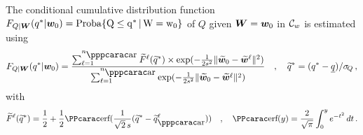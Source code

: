  The conditional cumulative distribution function $F_{Q \vert {\boldsymbol{W}}}(q^*\vert{\boldsymbol{w}}_{0}) 
= \rm{Proba}\{Q\leq q^*\,\vert\,{\boldsymbol{W}} = {\boldsymbol{w}}_0 \}$ of $Q$ given ${\boldsymbol{W}} = {\boldsymbol{w}}_0$ in ${\mathcal{C}}_w$ is estimated using
%
\begin{equation}\label{eqPLoMA8}
    F_{Q\vert\bfW}(q^* \vert \bfw_0 ) 
    = \frac{ \sum_{\ell=1}^{n_\ar} \widetilde{F}^\ell (\widetilde{q}^*) \times 
              \exp( -\frac{1}{2s^2} \Vert \widetilde{\bfw}_{0} - \widetilde{\bfw}^\ell \Vert^2 ) }
           { \sum_{\ell = 1}^{n_\ar} \exp( -\frac{1}{2s^2} \Vert \widetilde{\bfw}_{0} - \widetilde{\bfw}^\ell \Vert^2) } \quad , \quad \widetilde{q}^* = (q^* - \underline{q}) / \sigma_{\! Q}\,,
\end{equation}
with
\begin{equation}\label{eqPLoMA9}
    \widetilde{F}^\ell (\widetilde{q}^*) = \frac{1}{2} + \frac{1}{2}
    \erf(\frac{1}{\sqrt{2}\,s} ( \widetilde{q}^* - \widetilde{q}^\ell_{\ar} ) )
    \quad , \quad \erf(y) = \frac{2}{\sqrt{\pi}}\int_{0}^{y} e^{-t^2}\, dt \, .
\end{equation}